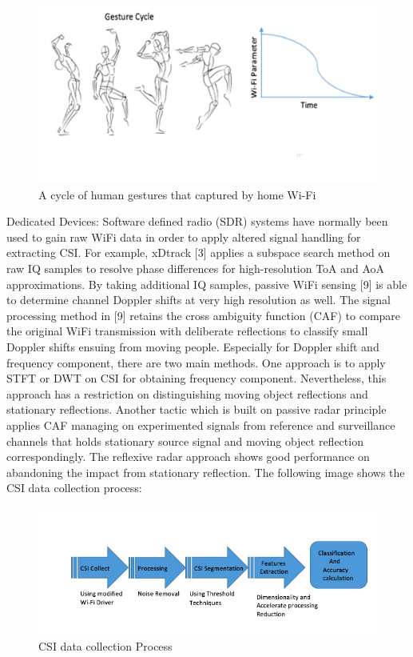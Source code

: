 \documentclass[conference]{IEEEtran}
\begin{document}
\begin{figure}[h!]
    \includegraphics[scale=0.20]{fig4.png}
    \caption{A cycle of human gestures that captured by home Wi-Fi}
    \label{fig:me}
\end{figure}


Dedicated Devices: Software defined radio (SDR) systems have normally been used to gain raw WiFi data in order to apply altered signal handling for extracting CSI. For example, xDtrack [3] applies a subspace search method on raw IQ samples to resolve phase differences for high-resolution ToA and AoA approximations. By taking additional IQ samples, passive WiFi sensing [9] is able to determine channel Doppler shifts at very high resolution as well. The signal processing method in [9] retains the cross ambiguity function (CAF) to compare the original WiFi transmission with deliberate reflections to classify small Doppler shifts ensuing from moving people. Especially for Doppler shift and frequency component, there are two main methods. One approach is to apply STFT or DWT on CSI for obtaining frequency component. Nevertheless, this approach has a restriction on distinguishing moving object reflections and stationary reflections. Another tactic which is built on passive radar principle applies CAF managing on experimented signals from reference and surveillance channels that holds stationary source signal and moving object reflection correspondingly. The reflexive radar approach shows good performance on abandoning the impact from stationary reflection. The following image shows the CSI data collection process:
\begin{figure}[h!]
    \includegraphics[scale=0.35]{fig10.png}
    \caption{CSI data collection Process}
    \label{fig:me}
\end{figure}
\end{document}
